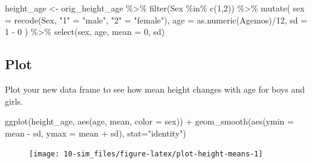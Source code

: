 \documentclass[
  oneside]{book}
\newenvironment{Shaded}{\begin{snugshade}}{\end{snugshade}}
\newcommand{\AttributeTok}[1]{\textcolor[rgb]{0.77,0.63,0.00}{#1}}
\newcommand{\DecValTok}[1]{\textcolor[rgb]{0.00,0.00,0.81}{#1}}
\newcommand{\FunctionTok}[1]{\textcolor[rgb]{0.00,0.00,0.00}{#1}}
\newcommand{\NormalTok}[1]{#1}
\newcommand{\OtherTok}[1]{\textcolor[rgb]{0.56,0.35,0.01}{#1}}
\newcommand{\SpecialCharTok}[1]{\textcolor[rgb]{0.00,0.00,0.00}{#1}}
\newcommand{\StringTok}[1]{\textcolor[rgb]{0.31,0.60,0.02}{#1}}
\begin{document}
\begin{Shaded}
\begin{Highlighting}[]
\NormalTok{height\_age }\OtherTok{\textless{}{-}}\NormalTok{ orig\_height\_age }\SpecialCharTok{\%\textgreater{}\%}
  \FunctionTok{filter}\NormalTok{(Sex }\SpecialCharTok{\%in\%} \FunctionTok{c}\NormalTok{(}\DecValTok{1}\NormalTok{,}\DecValTok{2}\NormalTok{)) }\SpecialCharTok{\%\textgreater{}\%}
  \FunctionTok{mutate}\NormalTok{(}
    \AttributeTok{sex =} \FunctionTok{recode}\NormalTok{(Sex, }\StringTok{"1"} \OtherTok{=} \StringTok{"male"}\NormalTok{, }\StringTok{"2"} \OtherTok{=} \StringTok{"female"}\NormalTok{),}
    \AttributeTok{age =} \FunctionTok{as.numeric}\NormalTok{(Agemos)}\SpecialCharTok{/}\DecValTok{12}\NormalTok{,}
    \AttributeTok{sd =} \StringTok{\textasciigrave{}}\AttributeTok{1}\StringTok{\textasciigrave{}} \SpecialCharTok{{-}} \StringTok{\textasciigrave{}}\AttributeTok{0}\StringTok{\textasciigrave{}}
\NormalTok{  ) }\SpecialCharTok{\%\textgreater{}\%}
  \FunctionTok{select}\NormalTok{(sex, age, }\AttributeTok{mean =} \StringTok{\textasciigrave{}}\AttributeTok{0}\StringTok{\textasciigrave{}}\NormalTok{, sd)}
\end{Highlighting}
\end{Shaded}

\hypertarget{plot}{%
\subsection{Plot}\label{plot}}

Plot your new data frame to see how mean height changes with age for boys and girls.

\begin{Shaded}
\begin{Highlighting}[]
\FunctionTok{ggplot}\NormalTok{(height\_age, }\FunctionTok{aes}\NormalTok{(age, mean, }\AttributeTok{color =}\NormalTok{ sex)) }\SpecialCharTok{+}
  \FunctionTok{geom\_smooth}\NormalTok{(}\FunctionTok{aes}\NormalTok{(}\AttributeTok{ymin =}\NormalTok{ mean }\SpecialCharTok{{-}}\NormalTok{ sd, }
                  \AttributeTok{ymax =}\NormalTok{ mean }\SpecialCharTok{+}\NormalTok{ sd),}
              \AttributeTok{stat=}\StringTok{"identity"}\NormalTok{)}
\end{Highlighting}
\end{Shaded}

\begin{figure}

{\centering \texttt{[image: 10-sim\_files/figure-latex/plot-height-means-1]} 

}

\end{figure}
\end{document}
